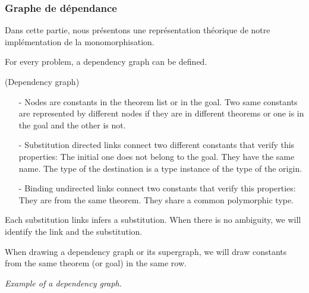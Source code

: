 \subsubsection{Graphe de dépendance}
Dans cette partie, nous présentons une représentation théorique de notre implémentation de la monomorphisation.
\vspace{2mm}

\iffalse
\noindent For every problem, a dependency graph can be defined. 
\begin{mydef} (Dependency graph)
\begin{enumerate}
  \item [-] Nodes are constants in the theorem list or in the goal. Two same constants are represented by different nodes if they are in different theorems or one is in the goal and the other is not.
  \item [-] {\color{blue}Substitution} directed links connect two different constants that verify this properties: 
    \subitem The initial one does not belong to the goal.
    \subitem They have the same name.
    \subitem The type of the destination is a type instance of the type of the origin. 
  \item [-] {\color{green}Binding} undirected links connect two constants that verify this properties: 
    \subitem They are from the same theorem.
    \subitem They share a common polymorphic type.    
\end{enumerate}    
Each substitution links infers a substitution. When there is no ambiguity, we will identify the link and the substitution.
\end{mydef}


\begin{remark}
When drawing a dependency graph or its supergraph, we will draw  constants from the same theorem (or goal) in the same row.
\end{remark}

\noindent \textit{Example of a dependency graph.} 
\begin{center}  
\end{center}

